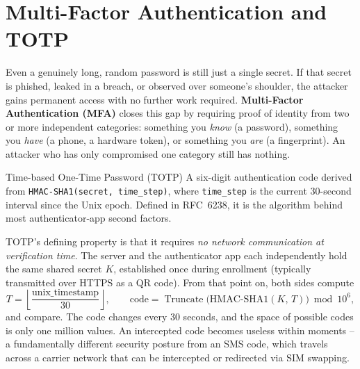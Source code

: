 \section{Multi-Factor Authentication and TOTP}

Even a genuinely long, random password is still just a single secret. If that secret is
phished, leaked in a breach, or observed over someone's shoulder, the attacker gains permanent
access with no further work required. \textbf{Multi-Factor Authentication (MFA)} closes this gap
by requiring proof of identity from two or more independent categories: something you
\emph{know} (a password), something you \emph{have} (a phone, a hardware token), or something
you \emph{are} (a fingerprint). An attacker who has only compromised one category still has
nothing.

\begin{definition}{Time-based One-Time Password (TOTP)}
A six-digit authentication code derived from \texttt{HMAC-SHA1(secret, time\_step)}, where
\texttt{time\_step} is the current 30-second interval since the Unix epoch. Defined in RFC~6238,
it is the algorithm behind most authenticator-app second factors.
\end{definition}

TOTP's defining property is that it requires \emph{no network communication at verification
time}. The server and the authenticator app each independently hold the same shared secret $K$,
established once during enrollment (typically transmitted over HTTPS as a QR code). From that
point on, both sides compute
\[
T = \left\lfloor \frac{\text{unix\_timestamp}}{30} \right\rfloor, \qquad
\text{code} = \operatorname{Truncate}\big(\mathrm{HMAC\text{-}SHA1}(K,\, T)\big) \bmod 10^{6},
\]
and compare. The code changes every 30 seconds, and the space of possible codes is only
one million values. An intercepted code becomes useless within moments -- a fundamentally
different security posture from an SMS code, which travels across a carrier network that can be
intercepted or redirected via SIM swapping.


